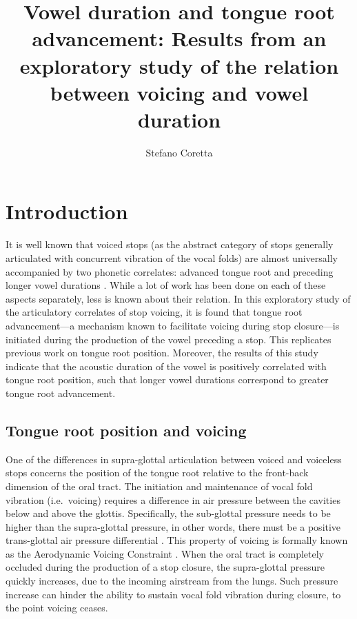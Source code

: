 \documentclass[12pt,]{article}
\title{Vowel duration and tongue root advancement: Results from an exploratory
study of the relation between voicing and vowel duration}
\author{Stefano Coretta}
\date{}
\begin{document}
\maketitle

\hypertarget{introduction}{%
\section{Introduction}\label{introduction}}

It is well known that voiced stops (as the abstract category of stops
generally articulated with concurrent vibration of the vocal folds) are
almost universally accompanied by two phonetic correlates: advanced
tongue root and preceding longer vowel durations
\citep{westbury1983, lisker1974, fowler1992}. While a lot of work has
been done on each of these aspects separately, less is known about their
relation. In this exploratory study of the articulatory correlates of
stop voicing, it is found that tongue root advancement---a mechanism
known to facilitate voicing during stop closure---is initiated during
the production of the vowel preceding a stop. This replicates previous
work on tongue root position. Moreover, the results of this study
indicate that the acoustic duration of the vowel is positively
correlated with tongue root position, such that longer vowel durations
correspond to greater tongue root advancement.

\hypertarget{tongue-root-position-and-voicing}{%
\subsection{Tongue root position and
voicing}\label{tongue-root-position-and-voicing}}

One of the differences in supra-glottal articulation between voiced and
voiceless stops concerns the position of the tongue root relative to the
front-back dimension of the oral tract. The initiation and maintenance
of vocal fold vibration (i.e.~voicing) requires a difference in air
pressure between the cavities below and above the glottis. Specifically,
the sub-glottal pressure needs to be higher than the supra-glottal
pressure, in other words, there must be a positive trans-glottal air
pressure differential \citep{berg1958, rothenberg1967}. This property of
voicing is formally known as the Aerodynamic Voicing Constraint
\citep{ohala2011}. When the oral tract is completely occluded during the
production of a stop closure, the supra-glottal pressure quickly
increases, due to the incoming airstream from the lungs. Such pressure
increase can hinder the ability to sustain vocal fold vibration during
closure, to the point voicing ceases.
\end{document}
